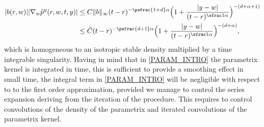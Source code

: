 {\begin{equation}\label{DRIFT_KERNEL_BD_INTRO_SUB_CRIT}
\begin{aligned}
|b(r,w)||\nabla_w \tilde p^y(r,w,t,y)|
&\le  C \|b\|_\infty(t-r)^{-\psfrac{1+d}\alpha}\Bigl(1+\frac{|y-w|}{(t-r)^{\sfrac 1\alpha}}\Bigr)^{-(d+\alpha+1)}\\
&\le  \tilde C (t-r)^{-\psfrac{d+1}\alpha}\Bigl(1+\frac{|y-w|}{(t-r)^{\sfrac 1\alpha}}\Bigr)^{-(d+\alpha)},
\end{aligned}
\end{equation}
which is homogeneous to an isotropic stable density multiplied by a time integrable singularity.
Having in mind that in \eqref{PARAM_INTRO} the parametrix kernel is integrated in time,
this is sufficient to provide a smoothing effect in small time, \ie the integral term in \eqref{PARAM_INTRO} will be negligible with respect to to the first order approximation, provided we manage to control the series expansion deriving from the iteration of the procedure. This requires to control convolutions of the density of the parametrix and iterated convolutions of the parametrix kernel.}

